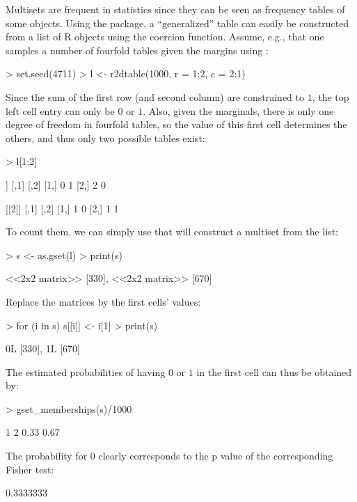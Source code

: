\documentclass[article]{jss}
\newcommand\R{\textsf{R}}
\newcommand{\codefun}[1]{\code{#1()}}
\newcommand{\dQuote}[1]{``{#1}''}
\begin{document}
Multisets are frequent in statistics since they can be seen as
frequency tables of some objects. Using the  package, a
\dQuote{generalized} table can easily be constructed from a list of \R{}
objects using the \codefun{as.gset} coercion function. Assume, e.g., that one
samples a number of fourfold tables given the margins using \codefun{r2dtable}:
\begin{Schunk}
\begin{Sinput}
> set.seed(4711)
> l <- r2dtable(1000, r = 1:2, c = 2:1)
\end{Sinput}
\end{Schunk}
Since the sum of the first row (and second column) are constrained to
$1$, the top left cell entry can only be $0$ or $1$. Also, given the marginals,
there is only one degree of freedom in fourfold tables,
so the value of this first cell determines the others, and thus
only two possible tables exist:
\begin{Schunk}
\begin{Sinput}
> l[1:2]
\end{Sinput}
\begin{Soutput}
[[1]]
     [,1] [,2]
[1,]    0    1
[2,]    2    0

[[2]]
     [,1] [,2]
[1,]    1    0
[2,]    1    1
\end{Soutput}
\end{Schunk}
To count them, we can simply use \codefun{as.gset} that will construct a
multiset from the list:
\begin{Schunk}
\begin{Sinput}
> s <- as.gset(l)
> print(s)
\end{Sinput}
\begin{Soutput}
{<<2x2 matrix>> [330], <<2x2 matrix>> [670]}
\end{Soutput}
\end{Schunk}
Replace the matrices by the first cells' values:
\begin{Schunk}
\begin{Sinput}
> for (i in s) s[[i]] <- i[1]
> print(s)
\end{Sinput}
\begin{Soutput}
{0L [330], 1L [670]}
\end{Soutput}
\end{Schunk}
The estimated probabilities of having $0$ or $1$ in the first cell can thus
be obtained by:
\begin{Schunk}
\begin{Sinput}
> gset_memberships(s)/1000
\end{Sinput}
\begin{Soutput}
   1    2 
0.33 0.67 
\end{Soutput}
\end{Schunk}
The probability for $0$
clearly corresponds to the p value of the corresponding Fisher test:
\begin{Schunk}
\begin{Soutput}
[1] 0.3333333
\end{Soutput}
\end{Schunk}
\end{document}
